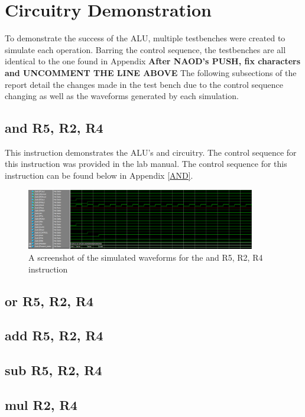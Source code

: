 \documentclass{article}
\begin{document}
\section{Circuitry Demonstration}

    To demonstrate the success of the ALU, multiple testbenches were created to simulate each operation. Barring the control sequence, the testbenches are all identical to the one found in Appendix 
    \textbf{After NAOD's PUSH, fix characters and  UNCOMMENT THE LINE ABOVE}
    The following subsections of the report detail the changes made in the test bench due to the control sequence changing as well as the waveforms generated by each simulation.

    \subsection{and R5, R2, R4}
    This instruction demonstrates the ALU's and circuitry. The control sequence for this instruction was provided in the lab manual. The control sequence for this instruction can be found below in Appendix \ref{AND}.
    
    \begin{figure}
        \begin{center}
            \includegraphics[width=10cm]{and}
            \caption{A screenshot of the simulated waveforms for the and R5, R2, R4 instruction}
        \end{center}
    \end{figure}

    \subsection{or R5, R2, R4}
    \subsection{add R5, R2, R4}
    \subsection{sub R5, R2, R4}
    \subsection{mul R2, R4}
    
\end{document}
